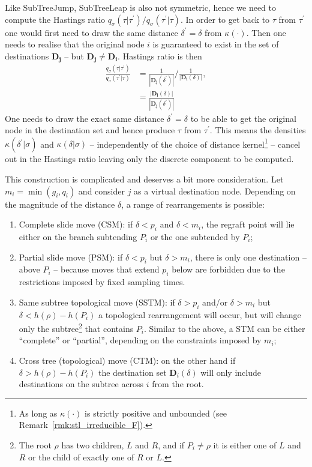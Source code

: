 Like SubTreeJump, SubTreeLeap is also not symmetric, hence we need to compute the Hastings ratio $q_{\sigma}(\tau|\tau^\prime)/q_{\sigma}(\tau^\prime|\tau)$.
In order to get back to $\tau$ from $\tau^\prime$ one would first need to draw the same distance $\delta^\prime = \delta$ from $\kappa(\cdot)$. 
Then one needs to realise that the original node $i$ is guaranteed to exist in the set of destinations $\mathbf{D_j}$ -- but $\mathbf{D_j} \neq \mathbf{D_i}$.
Hastings ratio is then 
\begin{align}
 \frac{q_{\sigma}(\tau|\tau^\prime)}{q_{\sigma}(\tau^\prime|\tau)} & = \frac{1}{|\mathbf{D_j}(\delta^\prime)|}/\frac{1}{|\mathbf{D_i}(\delta)|},  \\ \nonumber
 & = \frac{|\mathbf{D_i}(\delta)|}{|\mathbf{D_j}(\delta^\prime)|}
\end{align}
One needs to draw the exact same distance $\delta^\prime = \delta$ to be able to get the original node in the destination set and hence produce $\tau$ from $\tau^\prime$.
This means the densities $\kappa(\delta^\prime | \sigma)$ and $\kappa(\delta| \sigma)$ -- independently of the choice of distance kernel\footnote{As long as $\kappa(\cdot)$ is strictly positive and unbounded (see Remark~\ref{rmk:stl_irreducible_F}).} --  cancel out in the Hastings ratio leaving only the discrete component to be computed.

This construction is complicated and deserves a bit more consideration.
Let $m_i = \min(g_i, q_i)$ and consider $j$ as a virtual destination node.
Depending on the magnitude of the distance $\delta$, a range of rearrangements is possible:

\begin{enumerate}[label=\Alph*)]
 \item Complete slide move (CSM): if $\delta < p_i$ and $\delta < m_i$, the regraft point will lie either on the branch subtending $P_i$ or the one subtended by $P_i$;
 \item Partial slide move (PSM): if $\delta < p_i$ but $\delta > m_i$, there is only one destination -- above $P_i$ -- because moves that extend $p_i$ below are forbidden due to the restrictions imposed by fixed sampling times.
 \item Same subtree topological move (SSTM): if $\delta > p_i$ and/or $\delta > m_i$ but $\delta < h(\rho)-h(P_i)$ a topological rearrangement will occur, but will change only the subtree\footnote{The root $\rho$ has two children, $L$ and $R$, and if $P_i \neq \rho$ it is either one of $L$ and $R$ or the child of exactly one of $R$ or $L$.} that contains $P_i$.
 Similar to the above, a STM can be either ``complete'' or ``partial'', depending on the constraints imposed by $m_i$;
 \item Cross tree (topological) move (CTM): on the other hand if $\delta > h(\rho)-h(P_i)$ the destination set $\boldsymbol D_i(\delta)$ will only include destinations on the subtree across $i$ from the root.
 \end{enumerate}

